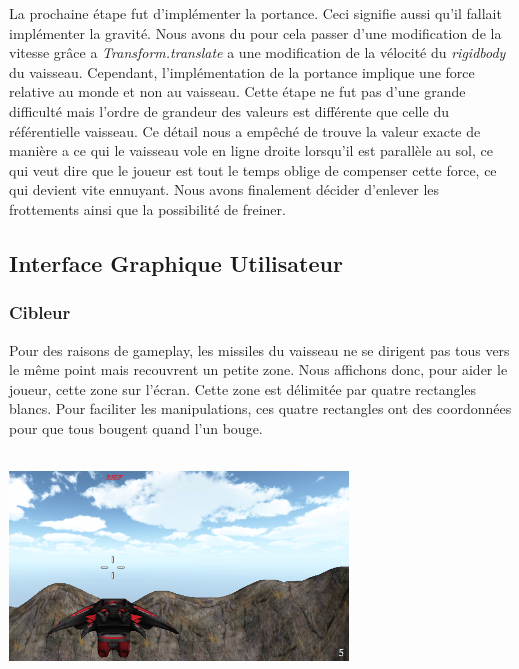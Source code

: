 \documentclass[10pt, titlepage]{report}
\begin{document}
La prochaine étape fut d'implémenter la portance. Ceci signifie aussi qu'il fallait implémenter la gravité. Nous avons du pour cela passer d'une modification de la vitesse grâce a \textit{Transform.translate} a une modification de la vélocité du \textit{rigidbody} du vaisseau. Cependant, l'implémentation de la portance implique une force relative au monde et non au vaisseau. Cette étape ne fut pas d'une grande difficulté mais l'ordre de grandeur des valeurs est différente que celle du référentielle vaisseau. Ce détail nous a empêché de trouve la valeur exacte de manière a ce qui le vaisseau vole en ligne droite lorsqu'il est parallèle au sol, ce qui veut dire que le joueur est tout le temps oblige de compenser cette force, ce qui devient vite ennuyant. Nous avons finalement décider d'enlever les frottements ainsi que la possibilité de freiner.\\

\subsection{Interface Graphique  Utilisateur}

\subsubsection{Cibleur}
 Pour des raisons de gameplay, les missiles du vaisseau ne se dirigent pas tous vers le même point mais recouvrent un petite zone. Nous affichons donc, pour aider le joueur, cette zone sur l'écran. Cette zone est délimitée par quatre rectangles blancs. Pour faciliter les manipulations, ces quatre rectangles ont des coordonnées pour que tous bougent quand l'un bouge. \\

\begin{center}
\includegraphics[height=6cm, width=9cm]{Capture_rebut.PNG}
\end{center}
\end{document}
